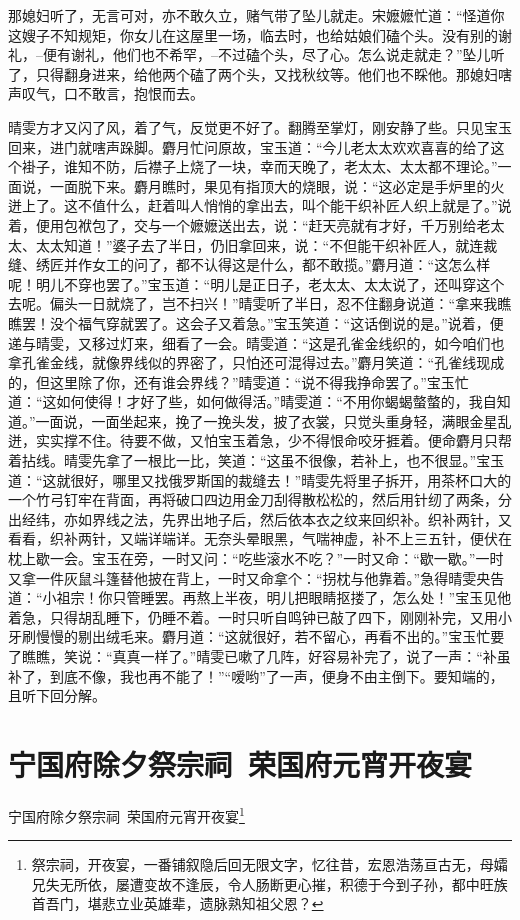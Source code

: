 \documentclass[12pt,oneside]{book}
\begin{document}
那媳妇听了，无言可对，亦不敢久立，赌气带了坠儿就走。宋嬷嬷忙道：“怪道你这嫂子不知规矩，你女儿在这屋里一场，临去时，也给姑娘们磕个头。没有别的谢礼，--便有谢礼，他们也不希罕，--不过磕个头，尽了心。怎么说走就走？”坠儿听了，只得翻身进来，给他两个磕了两个头，又找秋纹等。他们也不睬他。那媳妇嗐声叹气，口不敢言，抱恨而去。

晴雯方才又闪了风，着了气，反觉更不好了。翻腾至掌灯，刚安静了些。只见宝玉回来，进门就嗐声跺脚。麝月忙问原故，宝玉道：“今儿老太太欢欢喜喜的给了这个褂子，谁知不防，后襟子上烧了一块，幸而天晚了，老太太、太太都不理论。”一面说，一面脱下来。麝月瞧时，果见有指顶大的烧眼，说：“这必定是手炉里的火迸上了。这不值什么，赶着叫人悄悄的拿出去，叫个能干织补匠人织上就是了。”说着，便用包袱包了，交与一个嬷嬷送出去，说：“赶天亮就有才好，千万别给老太太、太太知道！”婆子去了半日，仍旧拿回来，说：“不但能干织补匠人，就连裁缝、绣匠并作女工的问了，都不认得这是什么，都不敢揽。”麝月道：“这怎么样呢！明儿不穿也罢了。”宝玉道：“明儿是正日子，老太太、太太说了，还叫穿这个去呢。偏头一日就烧了，岂不扫兴！”晴雯听了半日，忍不住翻身说道：“拿来我瞧瞧罢！没个福气穿就罢了。这会子又着急。”宝玉笑道：“这话倒说的是。”说着，便递与晴雯，又移过灯来，细看了一会。晴雯道：“这是孔雀金线织的，如今咱们也拿孔雀金线，就像界线似的界密了，只怕还可混得过去。”麝月笑道：“孔雀线现成的，但这里除了你，还有谁会界线？”晴雯道：“说不得我挣命罢了。”宝玉忙道：“这如何使得！才好了些，如何做得活。”晴雯道：“不用你蝎蝎螫螫的，我自知道。”一面说，一面坐起来，挽了一挽头发，披了衣裳，只觉头重身轻，满眼金星乱迸，实实撑不住。待要不做，又怕宝玉着急，少不得恨命咬牙捱着。便命麝月只帮着拈线。晴雯先拿了一根比一比，笑道：“这虽不很像，若补上，也不很显。”宝玉道：“这就很好，哪里又找俄罗斯国的裁缝去！”晴雯先将里子拆开，用茶杯口大的一个竹弓钉牢在背面，再将破口四边用金刀刮得散松松的，然后用针纫了两条，分出经纬，亦如界线之法，先界出地子后，然后依本衣之纹来回织补。织补两针，又看看，织补两针，又端详端详。无奈头晕眼黑，气喘神虚，补不上三五针，便伏在枕上歇一会。宝玉在旁，一时又问：“吃些滚水不吃？”一时又命：“歇一歇。”一时又拿一件灰鼠斗篷替他披在背上，一时又命拿个：“拐枕与他靠着。”急得晴雯央告道：“小祖宗！你只管睡罢。再熬上半夜，明儿把眼睛抠搂了，怎么处！”宝玉见他着急，只得胡乱睡下，仍睡不着。一时只听自鸣钟已敲了四下，刚刚补完，又用小牙刷慢慢的剔出绒毛来。麝月道：“这就很好，若不留心，再看不出的。”宝玉忙要了瞧瞧，笑说：“真真一样了。”晴雯已嗽了几阵，好容易补完了，说了一声：“补虽补了，到底不像，我也再不能了！”“嗳哟”了一声，便身不由主倒下。要知端的，且听下回分解。



\chapter{宁国府除夕祭宗祠~荣国府元宵开夜宴}
宁国府除夕祭宗祠~荣国府元宵开夜宴\footnote{祭宗祠，开夜宴，一番铺叙隐后回无限文字，忆往昔，宏恩浩荡亘古无，母孀兄失无所依，屡遭变故不逢辰，令人肠断更心摧，积德于今到子孙，都中旺族首吾门，堪悲立业英雄辈，遗脉熟知祖父恩？}
\end{document}
